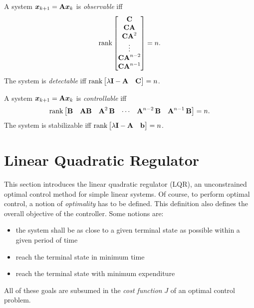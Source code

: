 			\begin{theorem}
				A system \( \bm{x}_{k + 1} = \bm{\mathrm{A}} \bm{x}_k \) is \emph{observable} iff
				\begin{equation}
					\rank
					\begin{bmatrix}
						\bm{\mathrm{C}}                 \\
						\bm{\mathrm{C}} \bm{\mathrm{A}}         \\
						\bm{\mathrm{C}} \bm{\mathrm{A}}^2       \\
						\vdots                  \\
						\bm{\mathrm{C}} \bm{\mathrm{A}}^{n - 2} \\
						\bm{\mathrm{C}} \bm{\mathrm{A}}^{n - 1}
					\end{bmatrix}
					= n.
				\end{equation}
				The system is \emph{detectable} iff \( \rank \begin{bmatrix} \lambda \bm{\mathrm{I}} - \bm{\mathrm{A}} & \bm{\mathrm{C}} \end{bmatrix} = n \).
			\end{theorem}
			\begin{theorem}
				A system \( \bm{x}_{k + 1} = \bm{\mathrm{A}} \bm{x}_k \) is \emph{controllable} iff
				\begin{equation}
					\rank
					\begin{bmatrix}
						\bm{\mathrm{B}}                   &
						\bm{\mathrm{A}} \bm{\mathrm{B}}           &
						\bm{\mathrm{A}}^2\, \bm{\mathrm{B}}       &
						\cdots                    &
						\bm{\mathrm{A}}^{n - 2}\, \bm{\mathrm{B}} &
						\bm{\mathrm{A}}^{n - 1}\, \bm{\mathrm{B}}
					\end{bmatrix}
					= n.
				\end{equation}
				The system is stabilizable iff \( \rank \begin{bmatrix} \lambda \bm{\mathrm{I}} - \bm{\mathrm{A}} & \bm{\mathrm{b}} \end{bmatrix} = n \).
			\end{theorem}

	\section{Linear Quadratic Regulator}
		This section introduces the linear quadratic regulator (LQR), an unconstrained optimal control method for simple linear systems. Of course, to perform optimal control, a notion of \emph{optimality} has to be defined. This definition also defines the overall objective of the controller. Some notions are:
		\begin{itemize}
			\item {} the system shall be as close to a given terminal state as possible within a given period of time
			\item {} reach the terminal state in minimum time
			\item {} reach the terminal state with minimum expenditure
		\end{itemize}
		All of these goals are subsumed in the \emph{cost function} \(J\) of an optimal control problem.


